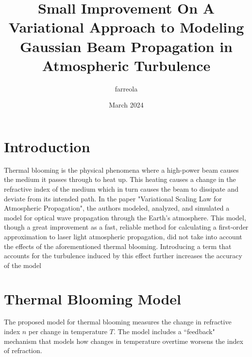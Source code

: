 \documentclass{article}
\title{Small Improvement On A Variational Approach to Modeling Gaussian Beam Propagation in Atmospheric Turbulence}
\author{farreola}
\date{March 2024}
\begin{document}
\maketitle

\section{Introduction}
Thermal blooming is the physical phenomena where a high-power beam causes the medium it passes through to heat up. This heating causes a change in the refractive index of the medium which in turn causes the beam to dissipate and deviate from its intended path. In the paper "Variational Scaling Law for Atmospheric Propagation", the authors modeled, analyzed, and simulated a model for optical wave propagation through the Earth's atmosphere. This model, though a great improvement as a fast, reliable method for calculating a first-order approximation to laser light atmospheric
propagation, did not take into account the effects of the aforementioned thermal blooming. Introducing a term that accounts for the turbulence induced by this effect further increases the accuracy of the model

\section{Thermal Blooming Model}
The proposed model for thermal blooming measures the change in refractive index $n$ per change in temperature $T$. The model includes a ``feedback" mechanism that models how changes in temperature overtime worsens the index of refraction.
\end{document}
